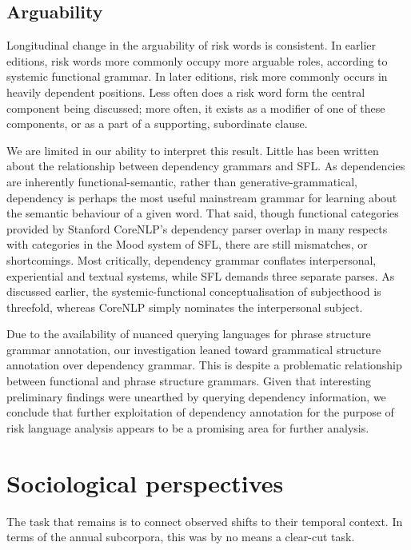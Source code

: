             \subsection{Arguability}

            Longitudinal change in the arguability of risk words is consistent. In earlier editions, risk words more commonly occupy more arguable roles, according to systemic functional grammar. In later editions, risk more commonly occurs in heavily dependent positions. Less often does a risk word form the central component being discussed; more often, it exists as a modifier of one of these components, or as a part of a supporting, subordinate clause.

            We are limited in our ability to interpret this result. Little has been written about the relationship between dependency grammars and SFL. As dependencies are inherently functional-semantic, rather than generative-grammatical, dependency is perhaps the most useful  mainstream grammar for learning about the semantic behaviour of a given word. That said, though functional categories provided by Stanford CoreNLP's dependency parser overlap in many respects with categories in the Mood system of SFL, there are still mismatches, or shortcomings. Most critically, dependency grammar conflates interpersonal, experiential and textual systems, while SFL demands three separate parses. As discussed earlier, the systemic-functional conceptualisation of subjecthood is threefold, whereas CoreNLP simply nominates the interpersonal subject.

            Due to the availability of nuanced querying languages for phrase structure grammar annotation, our investigation leaned toward grammatical structure annotation over dependency grammar. This is despite a problematic relationship between functional and phrase structure grammars. Given that interesting preliminary findings were unearthed by querying dependency information, we conclude that further exploitation of dependency annotation for the purpose of risk language analysis appears to be a promising area for further analysis.

	\section{Sociological perspectives}
            
	The task that remains is to connect observed shifts to their temporal context. In terms of the annual subcorpora, this was by no means a clear-cut task.

